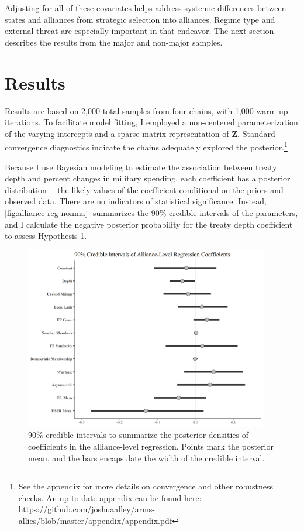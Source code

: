 \documentclass[12pt]{article}
\begin{document}
Adjusting for all of these covariates helps address systemic differences between states and alliances from strategic selection into alliances. 
Regime type and external threat are especially important in that endeavor. 
The next section describes the results from the major and non-major samples.
 

\section{Results}


Results are based on 2,000 total samples from four chains, with 1,000 warm-up iterations. 
To facilitate model fitting, I employed a non-centered parameterization of the varying intercepts and a sparse matrix representation of \textbf{Z}. 
Standard convergence diagnostics indicate the chains adequately explored the posterior.\footnote{See the appendix for more details on convergence and other robustness checks. An up to date appendix can be found here: https://github.com/joshuaalley/arms-allies/blob/master/appendix/appendix.pdf} 


Because I use Bayesian modeling to estimate the association between treaty depth and percent changes in military spending, each coefficient has a posterior distribution--- the likely values of the coefficient conditional on the priors and observed data.
There are no indicators of statistical significance. 
Instead, \autoref{fig:alliance-reg-nonmaj} summarizes the 90\% credible intervals of the parameters, and I calculate the negative posterior probability for the treaty depth coefficient to assess Hypothesis 1.


\begin{figure}[htbp]
	\centering
		\includegraphics[width=0.95\textwidth]{../figures/alliance-reg-nonmaj.png}
	\caption{90\% credible intervals to summarize the posterior densities of coefficients in the alliance-level regression. Points mark the posterior mean, and the bars encapsulate the width of the credible interval.}
	\label{fig:alliance-reg-nonmaj}
\end{figure}
\end{document}
